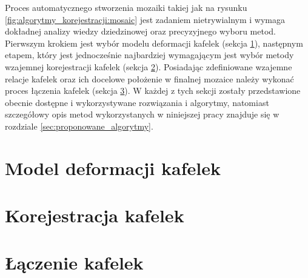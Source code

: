 Proces automatycznego stworzenia mozaiki takiej jak na rysunku \ref{fig:algorytmy_korejestracji:mosaic} jest zadaniem nietrywialnym i wymaga dokładnej analizy wiedzy dziedzinowej oraz precyzyjnego wyboru metod. Pierwszym krokiem jest wybór modelu deformacji kafelek (sekcja \ref{sec:algorytmy_korejestracji:model_deformacji}), następnym etapem, który jest jednocześnie najbardziej wymagającym jest wybór metody wzajemnej korejestracji kafelek (sekcja \ref{sec:algorytmy_korejestracji:korejestracja_kafelek}). Posiadając zdefiniowane wzajemne relacje kafelek oraz ich docelowe położenie w finalnej mozaice należy wykonać proces łączenia kafelek (sekcja \ref{sec:algorytmy_korejestracji:laczenie_kafelek}). W każdej z tych sekcji zostały przedstawione obecnie dostępne i wykorzystywane rozwiązania i algorytmy, natomiast szczegółowy opis metod wykorzystanych w niniejszej pracy znajduje się w rozdziale \ref{sec:proponowane_algorytmy}.

\section{Model deformacji kafelek}
\label{sec:algorytmy_korejestracji:model_deformacji}

\section{Korejestracja kafelek}
\label{sec:algorytmy_korejestracji:korejestracja_kafelek}

\section{Łączenie kafelek}
\label{sec:algorytmy_korejestracji:laczenie_kafelek}